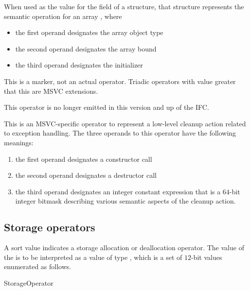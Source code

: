 When used as the value for the  field of a  structure, that structure
represents the semantic operation for an array , where
\begin{itemize}
	\item the first operand designates the array object type
	\item the second operand designates the array bound
	\item the third operand designates the initializer
\end{itemize}

This is a marker, not an actual operator. Triadic operators with 
value greater that this are MSVC extensions.

This operator is no longer emitted in this version and up of the IFC.

This is an MSVC-specific operator to represent a low-level cleanup action related to exception handling.
The three operands to this operator have the following meanings:
\begin{enumerate}
  \item the first operand designates a constructor call
  \item the second operand designates a destructor call
  \item the third operand designates an integer constant expression that is
   a $64$-bit integer bitmask describing various semantic aspects of the cleanup action. 
\end{enumerate}


\subsection{Storage operators}
\label{sec:ifc:OperatorSort:Storage}

A sort value  indicates a storage 
allocation or deallocation operator.  The
value of the  is to be interpreted as a value of type 
, which is a set of $12$-bit values enumerated as follows.
%
\begin{Enumeration}{StorageOperator}

	\setcounter{enumi}{2013}
\end{Enumeration}


